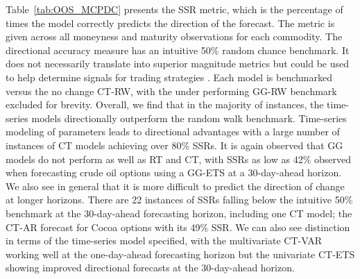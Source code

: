 \documentclass[12pt,a4paper]{article}
\begin{document}
\begin{table}[!hbtp]
\end{table}

Table~\ref{tab:OOS_MCPDC} presents the SSR metric, which is the percentage of times the model correctly predicts the direction of the forecast. The metric is given across all moneyness and maturity observations for each commodity. The directional accuracy measure has an intuitive 50\% random chance benchmark. It does not necessarily translate into superior magnitude metrics but could be used to help determine signals for trading strategies . Each model is benchmarked versus the no change CT-RW, with the under performing GG-RW benchmark excluded for brevity. Overall, we find that in the majority of instances, the time-series models directionally outperform the random walk benchmark. Time-series modeling of parameters leads to directional advantages with a large number of instances of CT models achieving over 80\% SSRs. It is again observed that GG models do not perform as well as RT and CT, with SSRs as low as 42\% observed when forecasting crude oil options using a GG-ETS at a 30-day-ahead horizon. We also see in general that it is more difficult to predict the direction of change at longer horizons. There are 22 instances of SSRs falling below the intuitive 50\% benchmark at the 30-day-ahead forecasting horizon, including one CT model; the CT-AR forecast for Cocoa options with its 49\% SSR. We can also see distinction in terms of the time-series model specified, with the multivariate CT-VAR working well at the one-day-ahead forecasting horizon but the univariate CT-ETS showing improved directional forecasts at the 30-day-ahead horizon.
\end{document}
